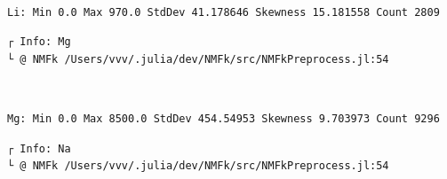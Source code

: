 \documentclass[11pt]{article}
\begin{document}
    \begin{center}
    \end{center}
    { \hspace*{\fill} \\}
    
    \begin{Verbatim}[commandchars=\\\{\}]
Li: Min 0.0 Max 970.0 StdDev 41.178646 Skewness 15.181558 Count 2809
    \end{Verbatim}

    \begin{Verbatim}[commandchars=\\\{\}]
┌ Info: Mg
└ @ NMFk /Users/vvv/.julia/dev/NMFk/src/NMFkPreprocess.jl:54
    \end{Verbatim}

    \begin{center}
    \end{center}
    { \hspace*{\fill} \\}
    
    \begin{Verbatim}[commandchars=\\\{\}]
Mg: Min 0.0 Max 8500.0 StdDev 454.54953 Skewness 9.703973 Count 9296
    \end{Verbatim}

    \begin{Verbatim}[commandchars=\\\{\}]
┌ Info: Na
└ @ NMFk /Users/vvv/.julia/dev/NMFk/src/NMFkPreprocess.jl:54
    \end{Verbatim}

    \begin{center}
    \end{center}
    { \hspace*{\fill} \\}
    
\end{document}
